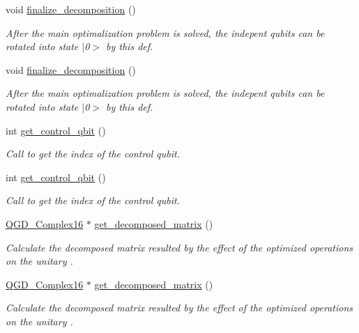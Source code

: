 \begin{DoxyCompactItemize}
void \hyperlink{class_decomposition___base_a0cdd12741e72e2c074a188fe3867e6d5}{finalize\+\_\+decomposition} ()
\begin{DoxyCompactList}\small\item\em After the main optimalization problem is solved, the indepent qubits can be rotated into state $\vert$0$>$ by this def. \end{DoxyCompactList}\item 
void \hyperlink{class_decomposition___base_a0cdd12741e72e2c074a188fe3867e6d5}{finalize\+\_\+decomposition} ()
\begin{DoxyCompactList}\small\item\em After the main optimalization problem is solved, the indepent qubits can be rotated into state $\vert$0$>$ by this def. \end{DoxyCompactList}\item 
int \hyperlink{class_operation_a2e9b60d334a0e0c99dede014ac989d0a}{get\+\_\+control\+\_\+qbit} ()
\begin{DoxyCompactList}\small\item\em Call to get the index of the control qubit. \end{DoxyCompactList}\item 
int \hyperlink{class_operation_a2e9b60d334a0e0c99dede014ac989d0a}{get\+\_\+control\+\_\+qbit} ()
\begin{DoxyCompactList}\small\item\em Call to get the index of the control qubit. \end{DoxyCompactList}\item 
\hyperlink{struct_q_g_d___complex16}{Q\+G\+D\+\_\+\+Complex16} $\ast$ \hyperlink{class_decomposition___base_a40154345dce69fd5a9cb28c0b677746b}{get\+\_\+decomposed\+\_\+matrix} ()
\begin{DoxyCompactList}\small\item\em Calculate the decomposed matrix resulted by the effect of the optimized operations on the unitary . \end{DoxyCompactList}\item 
\hyperlink{struct_q_g_d___complex16}{Q\+G\+D\+\_\+\+Complex16} $\ast$ \hyperlink{class_decomposition___base_ae71eaec68c77e79716cae632f97d42eb}{get\+\_\+decomposed\+\_\+matrix} ()
\begin{DoxyCompactList}\small\item\em Calculate the decomposed matrix resulted by the effect of the optimized operations on the unitary . \end{DoxyCompactList}\item 

\end{DoxyCompactItemize}
